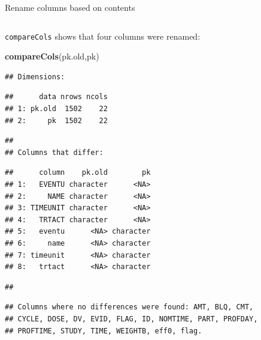 \documentclass[
  8pt,
  ignorenonframetext,
  aspectratio=169]{beamer}
\newenvironment{Shaded}{\begin{snugshade}}{\end{snugshade}}
\newcommand{\KeywordTok}[1]{\textcolor[rgb]{0.13,0.29,0.53}{\textbf{#1}}}
\newcommand{\NormalTok}[1]{#1}
\begin{document}
\begin{frame}[fragile]{Rename columns based on contents}
\begin{columns}[T]
\begin{column}{0.48\textwidth}
\texttt{compareCols} shows that four columns were renamed:

\begin{Shaded}
\begin{Highlighting}[]
\KeywordTok{compareCols}\NormalTok{(pk.old,pk)}
\end{Highlighting}
\end{Shaded}

\begin{verbatim}
## Dimensions:
\end{verbatim}

\begin{verbatim}
##      data nrows ncols
## 1: pk.old  1502    22
## 2:     pk  1502    22
\end{verbatim}

\begin{verbatim}
## 
## Columns that differ:
\end{verbatim}

\begin{verbatim}
##      column    pk.old        pk
## 1:   EVENTU character      <NA>
## 2:     NAME character      <NA>
## 3: TIMEUNIT character      <NA>
## 4:   TRTACT character      <NA>
## 5:   eventu      <NA> character
## 6:     name      <NA> character
## 7: timeunit      <NA> character
## 8:   trtact      <NA> character
\end{verbatim}

\begin{verbatim}
## 
\end{verbatim}

\begin{verbatim}
## Columns where no differences were found: AMT, BLQ, CMT,
## CYCLE, DOSE, DV, EVID, FLAG, ID, NOMTIME, PART, PROFDAY,
## PROFTIME, STUDY, TIME, WEIGHTB, eff0, flag.
\end{verbatim}

\normalsize
\end{column}
\end{columns}
\end{frame}
\end{document}
